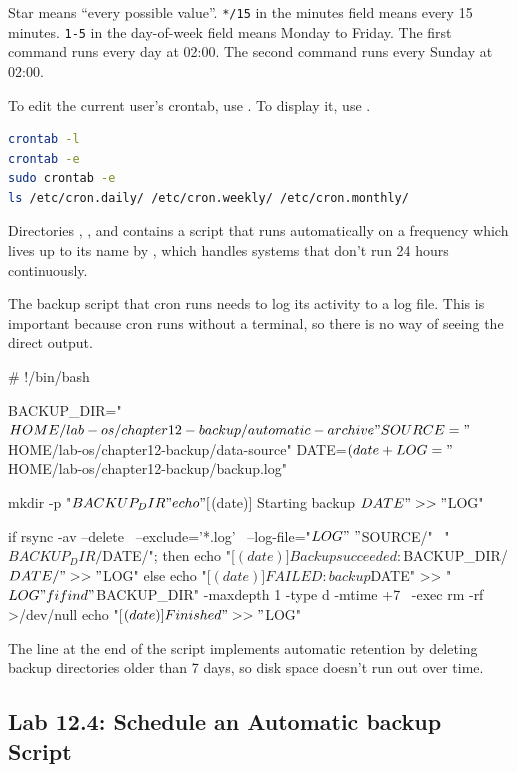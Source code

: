 Star means ``every possible value''. \texttt{*/15} in the minutes field means every 15 minutes. \texttt{1-5} in the day-of-week field means Monday to Friday. The first command runs every day at 02:00. The second command runs every Sunday at 02:00.

To edit the current user's crontab, use . To display it, use .

\begin{lstlisting}[language=bash, caption={Managing crontabs}]
crontab -l
crontab -e
sudo crontab -e
ls /etc/cron.daily/ /etc/cron.weekly/ /etc/cron.monthly/
\end{lstlisting}

Directories , , and
 contains a script that runs automatically on a frequency
which lives up to its name by , which handles systems that don't run 24 hours continuously.

The backup script that cron runs needs to log its activity to a log file. This is important because cron runs without a terminal, so there is no way of seeing the direct output.

\begin{longlisting}[language=bash, caption={Example backup script with logging}]
# !/bin/bash

BACKUP_DIR="$HOME/lab-os/chapter12-backup/automatic-archive"
SOURCE="$HOME/lab-os/chapter12-backup/data-source"
DATE=$(date +%
LOG="$HOME/lab-os/chapter12-backup/backup.log"

mkdir -p "$BACKUP_DIR"

echo "[$(date)] Starting backup $DATE" >> "$LOG"

if rsync -av --delete \
    --exclude='*.log' \
    --log-file="$LOG" \
    "$SOURCE/" \
    "$BACKUP_DIR/$DATE/"; then
    echo "[$(date)] Backup succeeded: $BACKUP_DIR/$DATE/" >> "$LOG"
else
    echo "[$(date)] FAILED: backup $DATE" >> "$LOG"
fi

find "$BACKUP_DIR" -maxdepth 1 -type d -mtime +7 \
    -exec rm -rf {} >/dev/null
echo "[$(date)] Finished" >> "$LOG"
\end{longlisting}

The \cmd{find} line at the end of the script implements automatic retention by deleting backup directories older than 7 days, so disk space doesn't run out over time.

\subsection*{Lab 12.4: Schedule an Automatic backup Script}

